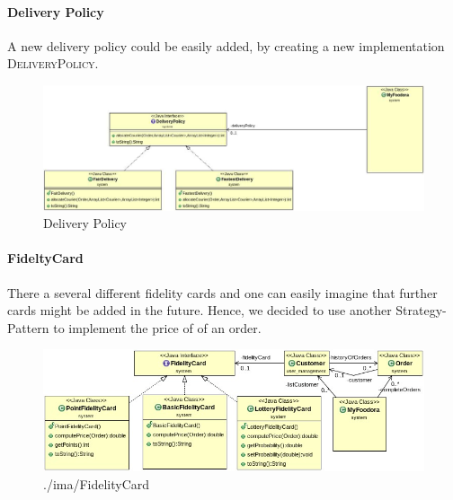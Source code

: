 \paragraph{Delivery Policy}
\label{par:delivery_policy}
A new delivery policy could be easily added, by creating a new implementation
\textsc{DeliveryPolicy}.

\begin{figure}[H]
	\centering
	\includegraphics[width=0.8\linewidth]{./ima/deliverypolicy.jpg}
	\caption{Delivery Policy}
	\label{fig:deliveryPolicy}
\end{figure}

\paragraph{FideltyCard}
\label{par:fideltycard}

There a several different fidelity cards and one can easily imagine that further cards might be 
added in the future. Hence, we decided to use another Strategy-Pattern to implement the price of
of an order. 

\begin{figure}[H]
	\centering
	\includegraphics[width=1\linewidth]{./ima/fidelitycard.jpg}
	\caption{./ima/FidelityCard}
	\label{fig:./ima/fidelityCard}
\end{figure}
